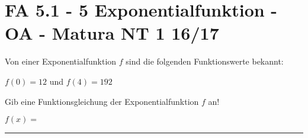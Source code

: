 \section{FA 5.1 - 5 Exponentialfunktion - OA - Matura NT 1 16/17}

\begin{beispiel}[FA 5.1]{1} %
Von einer Exponentialfunktion $f$ sind die folgenden Funktionswerte bekannt:

$f(0)=12$ und $f(4)=192$

Gib eine Funktionsgleichung der Exponentialfunktion $f$ an!\leer

$f(x)=$ \rule{3cm}{0.3pt}

\end{beispiel}